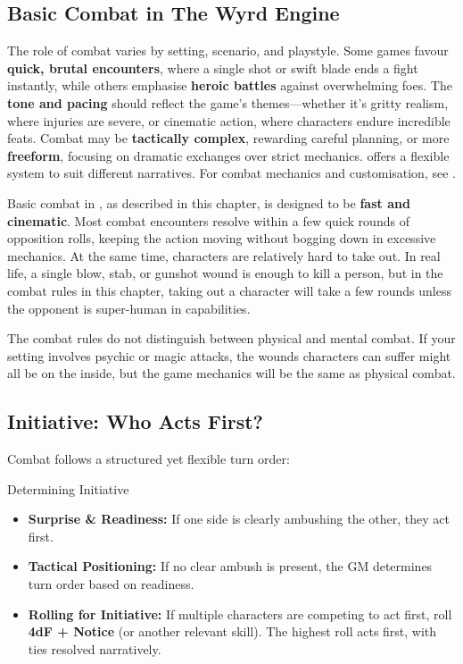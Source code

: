 \begin{multicols}{2}

\section{Basic Combat in The Wyrd Engine}

The role of combat varies by setting, scenario, and playstyle. Some games favour \textbf{quick, brutal encounters}, where a single shot or swift blade ends a fight instantly, while others emphasise \textbf{heroic battles} against overwhelming foes. The \textbf{tone and pacing} should reflect the game's themes—whether it’s gritty realism, where injuries are severe, or cinematic action, where characters endure incredible feats. Combat may be \textbf{tactically complex}, rewarding careful planning, or more \textbf{freeform}, focusing on dramatic exchanges over strict mechanics. \wyrd offers a flexible system to suit different narratives. For combat mechanics and customisation, see .

Basic combat in \wyrd, as described in this chapter, is designed to be \textbf{fast and cinematic}. Most combat encounters resolve within a few quick rounds of opposition rolls, keeping the action moving without bogging down in excessive mechanics. At the same time, characters are relatively hard to take out. In real life, a single blow, stab, or gunshot wound is enough to kill a person, but in the combat rules in this chapter, taking out a character will take a few rounds unless the opponent is super-human in capabilities.

The combat rules do not distinguish between physical and mental combat. If your setting involves psychic or magic attacks, the wounds characters can suffer might all be on the inside, but the game mechanics will be the same as physical combat.

\subsection{Initiative: Who Acts First?}

Combat follows a structured yet flexible turn order:

\begin{Example}{Determining Initiative}
	\begin{itemize}\raggedright
    	\item \textbf{Surprise \& Readiness:} If one side is clearly ambushing the other, they act first.
	    \item \textbf{Tactical Positioning:} If no clear ambush is present, the GM determines turn order based on readiness.
	    \item \textbf{Rolling for Initiative:} If multiple characters are competing to act first, roll \textbf{4dF + Notice} (or another relevant skill). The highest roll acts first, with ties resolved narratively.
	\end{itemize}
\end{Example}


\end{multicols}
